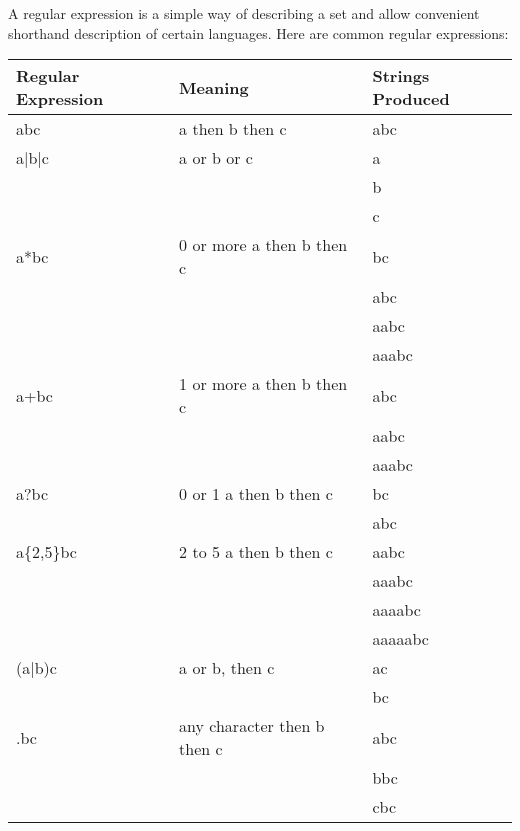   \noindent
  A regular expression is a simple way of describing a set and allow convenient shorthand description of certain languages. Here are common regular expressions:
  \begin{table}[H]
  	\begin{tabular}{l | l | l}
  		Regular Expression & Meaning & Strings Produced \\\hline
  		abc         & a then b then c                 & abc \\\hline
  		a|b|c       & a or b or c                     & a \\
	  	            &                                 & b \\
	  	            &                                 & c \\\hline
	  	a*bc        & 0 or more a then b then c       & bc\\
	  	            &                                 & abc \\
	  	            &                                 & aabc \\
	  	            &                                 & aaabc \\\hline
	  	a+bc        & 1 or more a then b then c       & abc \\
	  	            &                                 & aabc \\
	  	            &                                 & aaabc \\\hline
	    a?bc        & 0 or 1 a then b then c          & bc \\
	                &                                 & abc \\\hline
	    a\{2,5\}bc  & 2 to 5 a then b then c          & aabc \\
	                &                                 & aaabc \\
	                &                                 & aaaabc \\
	                &                                 & aaaaabc \\\hline
	  	(a|b)c      & a or b, then c                  & ac \\
	  	            &                                 & bc \\\hline
	  	.bc         & any character then b then c     & abc\\
	  	            &                                 & bbc\\
	  	            &                                 & cbc\\

\end{tabular}
\end{table}

